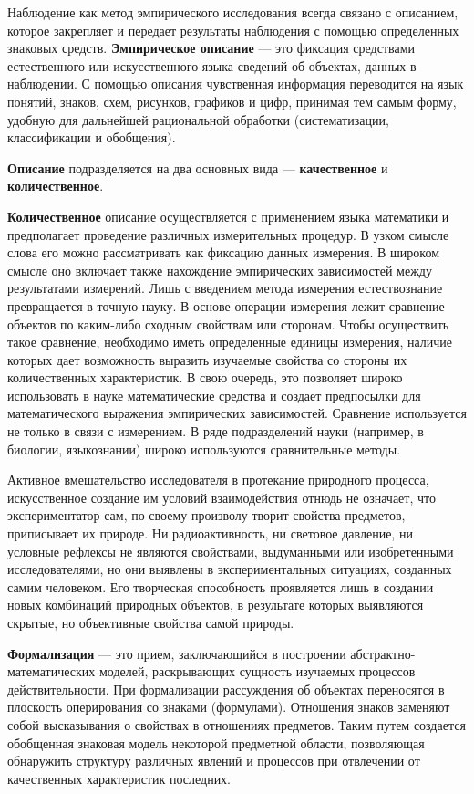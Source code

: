 Наблюдение как метод эмпирического исследования всегда связано с описанием, которое закрепляет и передает результаты наблюдения с помощью определенных знаковых средств. \textbf{Эмпирическое описание} --- это фиксация средствами естественного или искусственного языка сведений об объектах, данных в наблюдении. С помощью описания чувственная информация переводится на язык понятий, знаков, схем, рисунков, графиков и цифр, принимая тем самым форму, удобную для дальнейшей рациональной обработки (систематизации, классификации и обобщения).

\textbf{Описание} подразделяется на два основных вида --- \textbf{качественное} и \textbf{количественное}.

\textbf{Количественное} описание осуществляется с применением языка математики и предполагает проведение различных измерительных процедур. В узком смысле слова его можно рассматривать как фиксацию данных измерения. В широком смысле оно включает также нахождение эмпирических зависимостей между результатами измерений. Лишь с введением метода измерения естествознание превращается в точную науку. В основе операции измерения лежит сравнение объектов по каким-либо сходным свойствам или сторонам. Чтобы осуществить такое сравнение, необходимо иметь определенные единицы измерения, наличие которых дает возможность выразить изучаемые свойства со стороны их количественных характеристик. В свою очередь, это позволяет широко использовать в науке математические средства и создает предпосылки для математического выражения эмпирических зависимостей. Сравнение используется не только в связи с измерением. В ряде подразделений науки (например, в биологии, языкознании) широко используются сравнительные методы.

Активное вмешательство исследователя в протекание природного процесса, искусственное создание им условий взаимодействия отнюдь не означает, что экспериментатор сам, по своему произволу творит свойства предметов, приписывает их природе. Ни радиоактивность, ни световое давление, ни условные рефлексы не являются свойствами, выдуманными или изобретенными исследователями, но они выявлены в экспериментальных ситуациях, созданных самим человеком. Его творческая способность проявляется лишь в создании новых комбинаций природных объектов, в результате которых выявляются скрытые, но объективные свойства самой природы.

\textbf{Формализация} --- это прием, заключающийся в построении абстрактно-математических моделей, раскрывающих сущность изучаемых процессов действительности. При формализации рассуждения об объектах переносятся в плоскость оперирования со знаками (формулами). Отношения знаков заменяют собой высказывания о свойствах в отношениях предметов. Таким путем создается обобщенная знаковая модель некоторой предметной области, позволяющая обнаружить структуру различных явлений и процессов при отвлечении от качественных характеристик последних.

